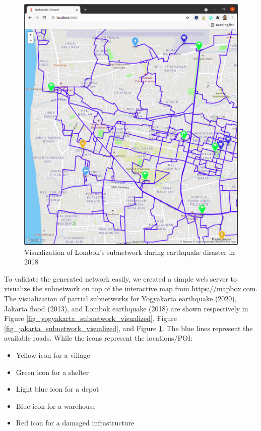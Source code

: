 \documentclass[conference]{IEEEtran}
\begin{document}
\begin{figure}
\centerline{\includegraphics[scale=0.24]{subnetwork-visualization-zoom-1-lombok.png}}
\caption{Visualization of Lombok's subnetwork during earthquake disaster in 2018}
\label{fig_lombok_subnetwork_visualized}
\end{figure}

To validate the generated network easily, we created a simple web server to visualize the subnetwork on top of the interactive map from \url{https://mapbox.com}. The visualization of partial subnetworks for Yogyakarta earthquake (2020), Jakarta flood (2013), and Lombok earthquake (2018) are shown respectively in Figure \ref{fig_yogyakarta_subnetwork_visualized}, Figure \ref{fig_jakarta_subnetwork_visualized}, and Figure \ref{fig_lombok_subnetwork_visualized}. The blue lines represent the available roads. While the icons represent the locations/POI: 

\begin{itemize}
\item Yellow icon for a village
\item Green icon for a shelter
\item Light blue icon for a depot
\item Blue icon for a warehouse
\item Red icon for a damaged infrastructure
\end{itemize}
\end{document}

